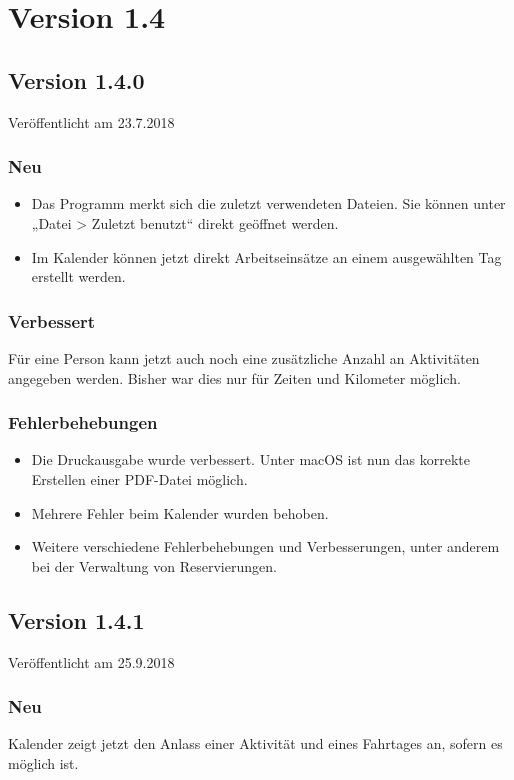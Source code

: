 \section{Version 1.4}\label{versionshistorie:1:4}
\subsection{Version 1.4.0}
\label{version:1:4:0}
Veröffentlicht am 23.7.2018
\subsubsection{Neu}
\begin{itemize}
  \item
  Das Programm merkt sich die zuletzt verwendeten Dateien. Sie können unter „Datei > Zuletzt benutzt“ direkt geöffnet werden.
  \item
  Im Kalender können jetzt direkt Arbeitseinsätze an einem ausgewählten Tag erstellt werden.
\end{itemize}

\subsubsection{Verbessert}
Für eine Person kann jetzt auch noch eine zusätzliche Anzahl an Aktivitäten angegeben werden. Bisher war dies nur für Zeiten und Kilometer möglich.

\subsubsection{Fehlerbehebungen}
\begin{itemize}
  \item
  Die Druckausgabe wurde verbessert. Unter macOS ist nun das korrekte Erstellen einer PDF-Datei möglich.
  \item
  Mehrere Fehler beim Kalender wurden behoben.
  \item
  Weitere verschiedene Fehlerbehebungen und Verbesserungen, unter anderem bei der Verwaltung von Reservierungen.
\end{itemize}

\subsection{Version 1.4.1}
\label{version:1:4:1}
Veröffentlicht am 25.9.2018
\subsubsection{Neu}
Kalender zeigt jetzt den Anlass einer Aktivität und eines Fahrtages an, sofern es möglich ist.

